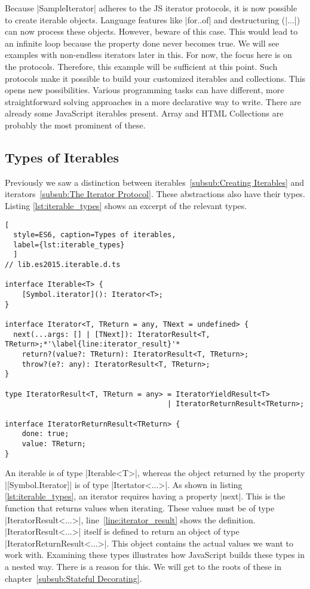 Because |SampleIterator| adheres to the JS iterator protocols, it is now 
possible to create iterable objects. Language features like |for..of| and 
destructuring (|...|) can now process these objects. However, beware of this 
case. This would lead to an infinite loop because the property done never 
becomes true. We will see examples with non-endless iterators later in this. 
For now, the focus here is on the protocols. Therefore, this 
example will be sufficient at this point.
\newline
Such protocols make it possible to build your customized iterables and
collections. This opens new possibilities. Various programming tasks can have 
different, more straightforward solving approaches in a more declarative way to
write.
There are already some JavaScript iterables present. Array and
HTML Collections are probably the most prominent of these.

\subsection{Types of Iterables}
\label{sub:Types of Iterables}
Previously we saw a distinction between 
iterables~\ref{subsub:Creating Iterables} and 
iterators~\ref{subsub:The Iterator Protocol}. These abstractions also have their 
types. Listing \ref{lst:iterable_types} shows an excerpt of the relevant types.

\begin{lstlisting}[
  style=ES6, caption=Types of iterables,
  label={lst:iterable_types}
  ]
// lib.es2015.iterable.d.ts

interface Iterable<T> {
    [Symbol.iterator](): Iterator<T>;
}

interface Iterator<T, TReturn = any, TNext = undefined> {
  next(...args: [] | [TNext]): IteratorResult<T, TReturn>;*'\label{line:iterator_result}'*
    return?(value?: TReturn): IteratorResult<T, TReturn>;
    throw?(e?: any): IteratorResult<T, TReturn>;
}

type IteratorResult<T, TReturn = any> = IteratorYieldResult<T> 
                                      | IteratorReturnResult<TReturn>;

interface IteratorReturnResult<TReturn> {
    done: true;
    value: TReturn;
}
\end{lstlisting}

An iterable is of type |Iterable<T>|, whereas the object returned by the property
|[Symbol.Iterator]| is of type |Itertator<...>|. As shown in listing
\ref{lst:iterable_types}, an iterator requires having a property |next|. 
This is the function that returns values when iterating. These values must be 
of type |IteratorResult<...>|, line~\ref{line:iterator_result} shows the 
definition. |IteratorResult<...>| itself is defined to return an 
object of type |IteratorReturnResult<...>|. This object contains the actual 
values we want to work with. Examining these types illustrates how JavaScript 
builds these types in a nested way. There is a reason for this. We will get to 
the roots of these in chapter~\ref{subsub:Stateful Decorating}.

